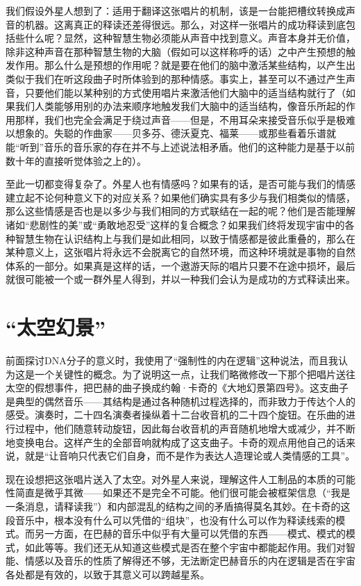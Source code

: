 我们假设外星人想到了：适用于翻译这张唱片的机制，该是一台能把槽纹转换成声音的机器。这离真正的释读还差得很远。那么，对这样一张唱片的成功释读到底包括些什么呢？显然，这种智慧生物必须能从声音中找到意义。声音本身并无价值，除非这种声音在那种智慧生物的大脑（假如可以这样称呼的话）之中产生预想的触发作用。那么什么是预想的作用呢？就是要在他们的脑中激活某些结构，以产生出类似于我们在听这段曲子时所体验到的那种情感。事实上，甚至可以不通过产生声音，只要他们能以某种别的方式使用唱片来激活他们大脑中的适当结构就行了（如果我们人类能够用别的办法来顺序地触发我们大脑中的适当结构，像音乐所起的作用那样，我们也完全会满足于绕过声音——但是，不用耳朵来接受音乐似乎是极难以想象的。失聪的作曲家——贝多芬、德沃夏克、福莱——或那些看着乐谱就能“听到”音乐的音乐家的存在并不与上述说法相矛盾。他们的这种能力是基于以前数十年的直接听觉体验之上的）。

至此一切都变得复杂了。外星人也有情感吗？如果有的话，是否可能与我们的情感建立起不论何种意义下的对应关系？如果他们确实具有多少与我们相类似的情感，那么这些情感是否也是以多少与我们相同的方式联结在一起的呢？他们是否能理解诸如“悲剧性的美”或“勇敢地忍受”这样的复合概念？如果我们终将发现宇宙中的各种智慧生物在认识结构上与我们是如此相同，以致于情感都是彼此重叠的，那么在某种意义上，这张唱片将永远不会脱离它的自然环境，而这种环境就是事物的自然体系的一部分。如果真是这样的话，一个遨游天际的唱片只要不在途中损坏，最后就很可能被一个或一群外星人得到，并以一种我们会认为是成功的方式释读出来。

\section{“太空幻景”}

前面探讨DNA分子的意义时，我使用了“强制性的内在逻辑”这种说法，而且我认为这是一个关键性的概念。为了说明这一点，让我们略微修改一下那个把唱片送往太空的假想事件，把巴赫的曲子换成约翰·卡奇的《大地幻景第四号》。这支曲子是典型的偶然音乐——其结构是通过各种随机过程选择的，而非致力于传达个人的感受。演奏时，二十四名演奏者操纵着十二台收音机的二十四个旋钮。在乐曲的进行过程中，他们随意转动旋钮，因此每台收音机的声音随机地增大或减少，并不断地变换电台。这样产生的全部音响就构成了这支曲子。卡奇的观点用他自己的话来说，就是“让音响只代表它们自身，而不是作为表达人造理论或人类情感的工具”。

现在设想把这张唱片送入了太空。对外星人来说，理解这件人工制品的本质的可能性简直是微乎其微——如果还不是完全不可能。他们很可能会被框架信息（“我是一条消息，请释读我”）和内部混乱的结构之间的矛盾搞得莫名其妙。在卡奇的这段音乐中，根本没有什么可以凭借的“组块”，也没有什么可以作为释读线索的模式。而另一方面，在巴赫的音乐中似乎有大量可以凭借的东西——模式、模式的模式，如此等等。我们还无从知道这些模式是否在整个宇宙中都能起作用。我们对智能、情感以及音乐的性质了解得还不够，无法断定巴赫音乐的内在逻辑是否在宇宙各处都是有效的，以致于其意义可以跨越星系。

